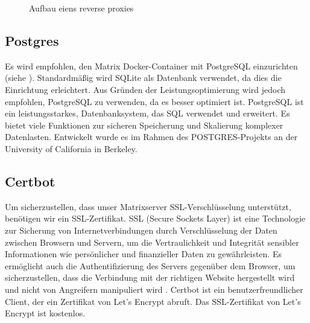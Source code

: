 \begin{figure}[H]
	\caption{Aufbau eiens reverse proxies}
\label{fig:patient_reverse_proxy}
\end{figure}

\subsection{Postgres}
Es wird empfohlen, den Matrix Docker-Container mit PostgreSQL einzurichten (siehe \cite{noauthor_installation_nodate}). Standardmäßig wird SQLite als Datenbank verwendet, da dies die Einrichtung erleichtert. Aus Gründen der Leistungsoptimierung wird jedoch empfohlen, PostgreSQL zu verwenden, da es besser optimiert ist.  PostgreSQL ist ein leistungsstarkes,  Datenbanksystem, das SQL verwendet und erweitert. Es bietet viele Funktionen zur sicheren Speicherung und Skalierung komplexer Datenlasten. Entwickelt wurde es im Rahmen des POSTGRES-Projekts an der University of California in Berkeley.\cite{noauthor_postgresql_nodate}

\subsection{Certbot}
Um sicherzustellen, dass unser Matrixserver SSL-Verschlüsselung unterstützt, benötigen wir ein SSL-Zertifikat.  SSL (Secure Sockets Layer) ist eine Technologie zur Sicherung von Internetverbindungen durch Verschlüsselung der Daten zwischen Browsern und Servern, um die Vertraulichkeit und Integrität sensibler Informationen wie persönlicher und finanzieller Daten zu gewährleisten. Es ermöglicht auch die Authentifizierung des Servers gegenüber dem Browser, um sicherzustellen, dass die Verbindung mit der richtigen Website hergestellt wird und nicht von Angreifern manipuliert wird \cite{SSL}. Certbot ist ein benutzerfreundlicher Client, der ein Zertifikat von Let's Encrypt abruft.  Das SSL-Zertifikat von Let's Encrypt ist kostenlos. 

